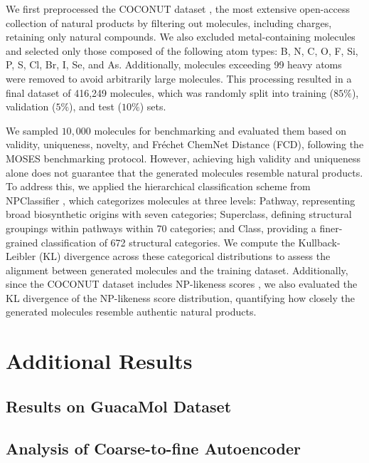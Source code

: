 We  first preprocessed the COCONUT dataset \citep{coconut, coconut2}
, the most extensive open-access collection of natural products by filtering out molecules, including charges, retaining only natural compounds. 
We also excluded metal-containing molecules and selected only those composed of the following atom types: B, N, C, O, F, Si, P, S, Cl, Br, I, Se, and As. 
Additionally, molecules exceeding 99 heavy atoms were removed to avoid arbitrarily large molecules.
This processing resulted in a final dataset of 416,249 molecules, which was randomly split into training ($85\%$), validation ($5\%$), and test ($10\%$) sets.

We sampled $10,000$ molecules for benchmarking and evaluated them based on validity, uniqueness, novelty, and Fréchet ChemNet Distance (FCD), following the MOSES benchmarking protocol.
However, achieving high validity and uniqueness alone does not guarantee that the generated molecules resemble natural products.
To address this, we applied the hierarchical classification scheme from NPClassifier \citep{npclassifier}, which categorizes molecules at three levels: Pathway, representing broad biosynthetic origins with seven categories; Superclass, defining structural groupings within pathways within 70 categories; and Class, providing a finer-grained classification of 672 structural categories.
We compute the Kullback-Leibler (KL) divergence across these categorical distributions to assess the alignment between generated molecules and the training dataset.
Additionally, since the COCONUT dataset includes NP-likeness scores \citep{np_likeness_score}, we also evaluated the KL divergence of the NP-likeness score distribution, quantifying how closely the generated molecules resemble authentic natural products. 


\section{Additional Results}
\label{appsec:additional_results}

\subsection{Results on GuacaMol Dataset}




\subsection{Analysis of Coarse-to-fine Autoencoder}


